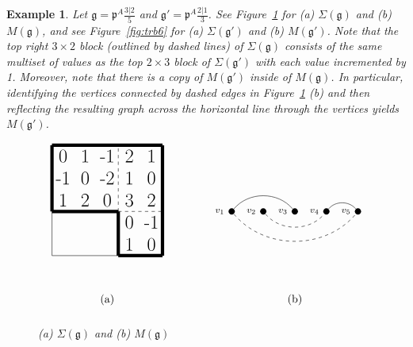 \documentclass[letterpaper,10pt]{article}
\newtheorem{Ex}[theorem]{Example}
\begin{document}
\begin{Ex}\label{ex:trb1}
Let $\mathfrak{g}=\mathfrak{p}^A\frac{3|2}{5}$ and $\mathfrak{g}'=\mathfrak{p}^A\frac{2|1}{3}$. See Figure~\ref{fig:trb5} for \textup{(a)} $\Sigma(\mathfrak{g})$ and \textup{(b)} $M(\mathfrak{g})$, and see Figure~\ref{fig:trb6} for \textup{(a)} $\Sigma(\mathfrak{g}')$ and \textup{(b)} $M(\mathfrak{g}')$. Note that the top right $3\times 2$ block \textup(outlined by dashed lines\textup) of $\Sigma(\mathfrak{g})$ consists of the same multiset of values as the top $2\times 3$ block of $\Sigma(\mathfrak{g}')$ with each value incremented by 1. Moreover, note that there is a copy of $M(\mathfrak{g}')$ inside of $M(\mathfrak{g})$. In particular, identifying the vertices connected by dashed edges in Figure~\ref{fig:trb5} \textup{(b)} and then reflecting the resulting graph across the horizontal line through the vertices yields $M(\mathfrak{g}')$.
\begin{figure}[H]
$$\begin{tikzpicture}[scale=0.7]
\draw (0,2) -- (0,7);
\draw (0,7) -- (5,7);
\draw (5,7) -- (5,2);
\draw (5,2) -- (0,2);
\draw [line width=3](0,7) -- (5,7);
\draw [line width=3](5,7) -- (5,2);
\draw [line width=3](5,2) -- (3,2);
\draw [line width=3](3,2) -- (3,4);
\draw [line width=3](3,4) -- (0,4);
\draw [line width=3](0,4) -- (0,7);

\draw[dashed] (3,4)--(5,4);
\draw[dashed] (3,4)--(3,7);

\node at (.5,6.5) {\LARGE{0}};
\node at (1.5,6.5) {\LARGE{1}};
\node at (2.5,6.5) {\LARGE{-1}};
\node at (3.5,6.5) {\LARGE{2}};
\node at (4.5,6.5) {\LARGE{1}};
\node at (.5,5.5) {\LARGE{-1}};
\node at (1.5,5.5) {\LARGE{0}};
\node at (2.5,5.5) {\LARGE{-2}};
\node at (3.5,5.5) {\LARGE{1}};
\node at (4.5,5.5) {\LARGE{0}};
\node at (.5,4.5) {\LARGE{1}};
\node at (1.5,4.5) {\LARGE{2}};
\node at (2.5,4.5) {\LARGE{0}};
\node at (3.5,4.5) {\LARGE{3}};
\node at (4.5,4.5) {\LARGE{2}};
\node at (3.5,3.5) {\LARGE{0}};
\node at (4.5,3.5) {\LARGE{-1}};
\node at (3.5,2.5) {\LARGE{1}};
\node at (4.5,2.5) {\LARGE{0}};
\node at (2.5, 0) {(a)};

\end{tikzpicture}\hspace{1.5cm}\begin{tikzpicture}
	\def\Node{\node [circle,  fill, inner sep=2pt]}
	\tikzset{->-/.style={decoration={
  markings,
  mark=at position .55 with {\arrow{>}}},postaction={decorate}}}
	\node at (0,-0.3) {};
    \Node[label=left:\footnotesize {$v_1$}] (1) at (0,1.8) {};
	\Node[label=left:\footnotesize {$v_2$}] (2) at (1,1.8) {};
	\Node[label=left:\footnotesize {$v_3$}] (3) at (2,1.8) {};
	\Node[label=left:\footnotesize {$v_4$}] (4) at (3,1.8) {};
	\Node[label=left:\footnotesize {$v_5$}] (5) at (4,1.8) {};
	\draw (3) to[bend right=50] (1);
	\draw (5) to[bend right=50] (4);
	\draw[dashed] (1) to[bend right=50] (5);
	\draw[dashed] (2) to[bend right=50] (4);
    \node at (2, -1) {(b)};
\end{tikzpicture}$$
\caption{(a) $\Sigma(\mathfrak{g})$ and (b) $M(\mathfrak{g})$}\label{fig:trb5}
\end{figure}


\end{Ex}
\end{document}
